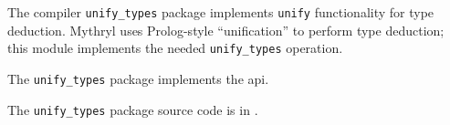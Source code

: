 
The compiler {\tt unify\_types} package implements {\tt unify} functionality 
for type deduction.  Mythryl uses Prolog-style ``unification'' to perform type 
deduction;  this module implements the needed {\tt unify\_types} operation. 

The {\tt unify\_types} package implements the  api.

The {\tt unify\_types} package source code is in .

